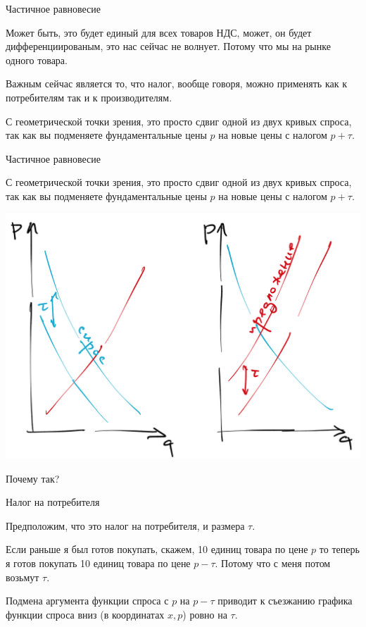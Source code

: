 \documentclass{beamer}
\begin{document}
\begin{frame}{Частичное равновесие}

 Может быть, это будет единый для всех товаров НДС, может, он будет дифференциированым, это нас сейчас не волнует. Потому что \alert{мы на рынке одного товара}.

Важным сейчас является то, что налог, вообще говоря, можно применять как к потребителям так и к производителям.

С геометрической точки зрения, это просто сдвиг одной из двух кривых спроса, так как вы подменяете фундаментальные цены $p$ на новые цены с налогом $p + \tau$.

\end{frame}

\begin{frame}{Частичное равновесие}

С геометрической точки зрения, это просто сдвиг одной из двух кривых спроса, так как вы подменяете фундаментальные цены $p$ на новые цены с налогом $p + \tau$.

    \begin{center}
     \includegraphics[width=.8\textwidth]{taxes}
     \end{center}
     
Почему так?

\end{frame}

\begin{frame}{Налог на потребителя}

Предположим, что это налог на потребителя, и размера $\tau$.

Если раньше я был готов покупать, скажем, 10 единиц товара по цене $p$ то теперь я готов покупать 10 единиц товара по цене $p-\tau$. Потому что с меня потом возьмут $\tau$.

Подмена аргумента функции спроса с $p$ на $p-\tau$ приводит к съезжанию графика функции спроса вниз (в координатах $x,p$) ровно на $\tau$.

\end{frame}
\end{document}
